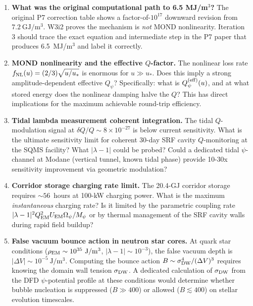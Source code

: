 \documentclass[aps,prd,twocolumn,superscriptaddress]{revtex4-2}
\newcommand{\Qpsi}{Q_\psi}
\newcommand{\Mpsi}{M_\psi}
\newcommand{\Opsi}{\Omega_\psi}
\newcommand{\lam}{|\lambda-1|}
\begin{document}
\begin{enumerate}
\item \textbf{What was the original computational path to 6.5 MJ/m$^3$?}
The original P7 correction table shows a factor-of-$10^{17}$ downward
revision from $7.2~\mathrm{GJ/m^3}$.  W3i2 proves the mechanism is
\emph{not} MOND nonlinearity.  Iteration 3 should trace the exact
equation and intermediate step in the P7 paper that produces 6.5~MJ/m$^3$
and label it correctly.

\item \textbf{MOND nonlinearity and the effective $Q$-factor.}
The nonlinear loss rate $f_{\rm NL}(u) = (2/3)\sqrt{u/u_*}$ is enormous
for $u \gg u_*$.  Does this imply a strong amplitude-dependent effective
$Q_\psi$?  Specifically: what is $\Qpsi^{(\rm eff)}(u)$, and at what
stored energy does the nonlinear damping halve the $Q$?  This has
direct implications for the maximum achievable round-trip efficiency.

\item \textbf{Tidal lambda measurement coherent integration.}
The tidal $Q$-modulation signal at $\delta Q/Q \sim 8\times 10^{-27}$
is below current sensitivity.  What is the ultimate sensitivity limit
for coherent 30-day SRF cavity $Q$-monitoring at the SQMS facility?
What $\lam$ could be probed?  Could a dedicated tidal $\psi$-channel
at Modane (vertical tunnel, known tidal phase) provide 10-30x
sensitivity improvement via geometric modulation?

\item \textbf{Corridor storage charging rate limit.}
The 20.4-GJ corridor storage requires $\sim 56$~hours at 100-kW
charging power.  What is the maximum \emph{instantaneous} charging
rate?  Is it limited by the parametric coupling rate
$\lam^2 Q_{\rm EM}^2 U_{\rm EM}\Opsi/\Mpsi$ or by thermal management
of the SRF cavity walls during rapid field buildup?

\item \textbf{False vacuum bounce action in neutron star cores.}
At quark star conditions ($\rho_{\rm EM} \sim 10^{35}~\mathrm{J/m^3}$,
$\lam \sim 10^{-3}$), the false vacuum depth is $|\Delta V| \sim 10^{-5}~\mathrm{J/m^3}$.
Computing the bounce action $B \sim \sigma_{\rm DW}^4/(\Delta V)^3$
requires knowing the domain wall tension $\sigma_{\rm DW}$.  A
dedicated calculation of $\sigma_{\rm DW}$ from the DFD $\psi$-potential
profile at these conditions would determine whether bubble nucleation
is suppressed ($B \gg 400$) or allowed ($B \lesssim 400$) on stellar
evolution timescales.
\end{enumerate}
\end{document}
